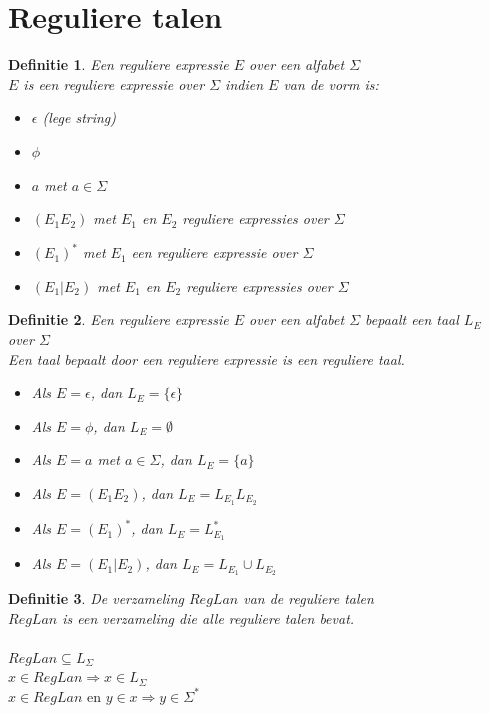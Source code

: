 \documentclass[a4paper]{article}
\newtheorem{tdefinitie}{Definitie}[section]
\newenvironment{definitie}[1]%
  {\begin{mdframed}[backgroundcolor=silver,
    topline=false,
    rightline=false,
    leftline=false,
    bottomline=false]\begin{tdefinitie}#1\\\normalfont}%
  {\end{tdefinitie}\end{mdframed}}
\newcommand{\en}{\ensuremath{\text{ en }}}
\newcommand{\sstar}{\ensuremath{\Sigma^*}}
\begin{document}
\newpage\section{Reguliere talen}

\begin{definitie}{Een reguliere expressie $E$ over een alfabet $\Sigma$}
  $E$ is een reguliere expressie over $\Sigma$ indien $E$ van de vorm is:
  \begin{itemize}
  \item $\epsilon$ (lege string)
  \item $\phi$
  \item $a$ met $a \in \Sigma$
  \item $(E_1E_2)$ met $E_1$ en $E_2$ reguliere expressies over $\Sigma$
  \item $(E_1)^*$ met $E_1$ een reguliere expressie over $\Sigma$
  \item $(E_1|E_2)$ met $E_1$ en $E_2$ reguliere expressies over $\Sigma$
  \end{itemize}
\end{definitie}

\begin{definitie}{Een reguliere expressie $E$ over een alfabet $\Sigma$ bepaalt een taal $L_E$ over $\Sigma$}
  Een taal bepaalt door een reguliere expressie is een reguliere taal.
  \begin{itemize}
  \item Als $E = \epsilon$, dan $L_E = \{\epsilon\}$
  \item Als $E = \phi$, dan $L_E = \emptyset$
  \item Als $E = a$ met $a \in \Sigma$, dan $L_E = \{a\}$
  \item Als $E = (E_1E_2)$, dan $L_E = L_{E_1}L_{E_2}$
  \item Als $E = (E_1)^*$, dan $L_E = L_{E_1}^*$
  \item Als $E = (E_1|E_2)$, dan $L_E = L_{E_1} \cup L_{E_2}$
  \end{itemize}
\end{definitie}

\begin{definitie}{De verzameling $RegLan$ van de reguliere talen}
  $RegLan$ is een verzameling die alle reguliere talen bevat. \\
  \\ $RegLan \subseteq L_\Sigma$
  \\ $x \in RegLan \Rightarrow x \in L_\Sigma$
  \\ $x \in RegLan \en y \in x \Rightarrow y \in \sstar$
\end{definitie}
\end{document}
